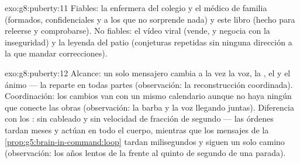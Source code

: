 \begin{solution}{exo:g8:puberty:11}
Fiables: la enfermera del colegio y el médico de familia (formados,
confidenciales y a los que no sorprende nada) y este libro (hecho para
releerse y comprobarse). No fiables: el vídeo viral (vende, y negocia
con la inseguridad) y la leyenda del patio (conjeturas repetidas sin
ninguna dirección a la que mandar correcciones).
\end{solution}

\begin{solution}{exo:g8:puberty:12}
Alcance: un solo mensajero cambia a la vez la voz, la , el
 y el ánimo --- la  reparte en todas partes
(observación: la reconstrucción coordinada). Coordinación: los cambios
van con un mismo calendario aunque no haya ningún  que conecte
las obras (observación: la barba y la voz llegando juntas). Diferencia
con los : sin cableado y sin velocidad de fracción de segundo
--- las órdenes tardan meses y actúan en todo el cuerpo, mientras que
los mensajes de la \cref{prop:g5:brain-in-command:loop} tardan
milisegundos y siguen un solo camino (observación: los años lentos de
la  frente al quinto de segundo de una parada).
\end{solution}

